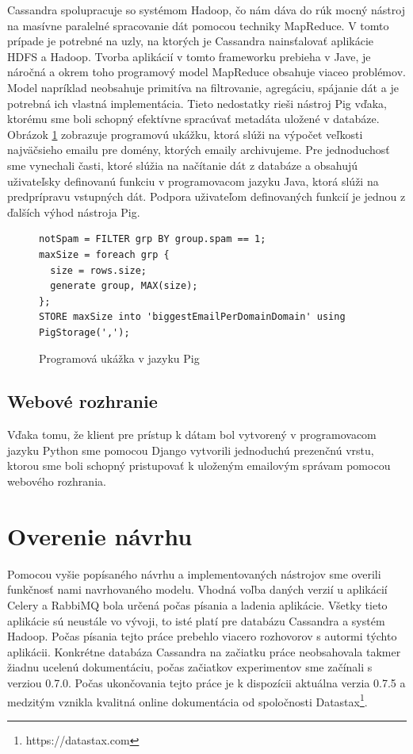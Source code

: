 \documentclass[11pt,twoside,a4paper]{book}
\begin{document}
Cassandra spolupracuje so systémom Hadoop, čo nám dáva do rúk mocný nástroj na masívne paralelné spracovanie dát pomocou techniky MapReduce. V tomto prípade je potrebné na uzly, na ktorých je Cassandra nainsťalovať aplikácie HDFS a Hadoop. Tvorba aplikácií v tomto frameworku prebieha v Jave, je náročná a okrem toho programový model MapReduce obsahuje viaceo problémov. Model napríklad neobsahuje primitíva na filtrovanie, agregáciu, spájanie dát a je potrebná ich vlastná implementácia. Tieto nedostatky rieši nástroj Pig \cite{olston2008pig} vďaka, ktorému sme boli schopný efektívne spracúvať metadáta uložené v databáze. Obrázok \ref{fig:PigExample} zobrazuje programovú ukážku, ktorá slúži na výpočet veľkosti najväčsieho emailu pre domény, ktorých emaily archivujeme. Pre jednoduchosť sme vynechali časti, ktoré slúžia na načítanie dát z databáze a obsahujú uživateľsky definovanú funkciu v programovacom jazyku Java, ktorá slúži na predprípravu vstupných dát. Podpora uživateľom definovaných funkcií je jednou z ďalších výhod nástroja Pig.

\begin{figure}[h]
\begin{verbatim}
notSpam = FILTER grp BY group.spam == 1;
maxSize = foreach grp {
  size = rows.size;
  generate group, MAX(size);
};
STORE maxSize into 'biggestEmailPerDomainDomain' using PigStorage(',');
\end{verbatim}
 \caption{Programová ukážka v jazyku Pig}
 \label{fig:PigExample}
\end{figure}  



\subsection{Webové rozhranie}
Vďaka tomu, že klient pre prístup k dátam bol vytvorený v programovacom jazyku Python sme pomocou Django vytvorili jednoduchú prezenčnú vrstu, ktorou sme boli schopný pristupovať k uloženým emailovým správam pomocou webového rozhrania.


\section{Overenie návrhu}

Pomocou vyšie popísaného návrhu a implementovaných nástrojov sme overili funkčnosť nami navrhovaného modelu. Vhodná voľba daných verzií u aplikácií Celery a RabbiMQ bola určená počas písania a ladenia aplikácie. Všetky tieto aplikácie sú neustále vo vývoji, to isté platí pre databázu Cassandra a systém Hadoop. Počas písania tejto práce prebehlo viacero rozhovorov s autormi týchto aplikácii. Konkrétne databáza Cassandra na začiatku práce neobsahovala takmer žiadnu ucelenú dokumentáciu, počas začiatkov experimentov sme začínali s verziou 0.7.0. Počas ukončovania tejto práce je k dispozícii aktuálna verzia 0.7.5 a medzitým vznikla kvalitná online dokumentácia od spoločnosti Datastax\footnote{https://datastax.com}. 
\end{document}
